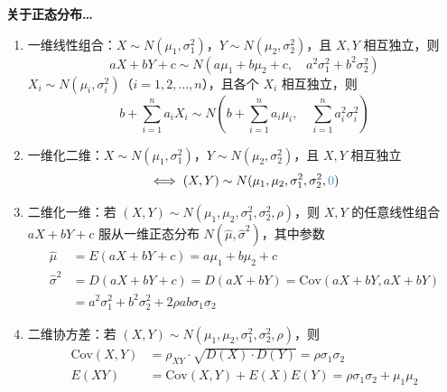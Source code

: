 \documentclass[UTF8]{ctexart}
\newcommand\Concept[1]{\textcolor{cyan!70!black}{#1}}
\newcommand\Cov{\mathrm{Cov}}
\begin{document}
\begin{mybox}
\textbf{关于正态分布…}
\begin{enumerate}
    \item 一维线性组合：$X\sim N(\mu_1,\sigma_1^2)$，$Y\sim N(\mu_2,\sigma_2^2)$，且 $X,Y$ \Concept{相互独立}，则
    \begin{equation*}
        aX+bY+c\sim N(a\mu_1+b\mu_2+c, \quad a^2\sigma_1^2+b^2\sigma_2^2)
    \end{equation*}
    $X_i\sim N(\mu_i, \sigma_i^2)$（$i=1,2,\dots,n$），且各个 $X_i$ \Concept{相互独立}，则
    \begin{equation*}
        b+\sum\limits_{i=1}^n  a_iX_i \sim N\left(b+\sum\limits_{i=1}^n  a_i\mu_i, \quad \sum\limits_{i=1}^n a_i^2\sigma_i^2\right)
    \end{equation*}
    \item 一维化二维：$X\sim N(\mu_1,\sigma_1^2)$，$Y\sim N(\mu_2,\sigma_2^2)$，且 $X,Y$ \Concept{相互独立}
    \begin{equation*}
        \iff (X,Y)\sim N(\mu_1,\mu_2,\sigma_1^2,\sigma_2^2,\textcolor{cyan!70!black}{0})
    \end{equation*}
    \item 二维化一维：若 $(X,Y)\sim N(\mu_1,\mu_2,\sigma_1^2,\sigma_2^2,\rho)$，则 $X,Y$ 的任意线性组合 $aX+bY+c$ 服从一维正态分布 $N(\hat{\mu},\hat{\sigma}^2)$，其中参数
    \begin{equation*}
    \begin{aligned}
        \hat{\mu} &= E(aX+bY+c) = a\mu_1+b\mu_2+c \\
        \hat{\sigma}^2 &= D(aX+bY+c) = D(aX+bY) = \Cov(aX+bY,aX+bY) \\
         &= a^2\sigma_1^2 + b^2\sigma_2^2 + 2\rho ab\sigma_1\sigma_2
    \end{aligned}
    \end{equation*}
    \item 二维协方差：若 $(X,Y)\sim N(\mu_1,\mu_2,\sigma_1^2,\sigma_2^2,\rho)$，则
    \begin{equation*}
    \begin{aligned}
        \Cov(X,Y) &= \rho_{XY}\cdot \sqrt{D(X)\cdot D(Y)} = \rho \sigma_1 \sigma_2 \\
        E(XY) &= \Cov(X,Y)+E(X)E(Y) = \rho\sigma_1\sigma_2 + \mu_1\mu_2 \\
    \end{aligned}
    \end{equation*}
\end{enumerate}

\end{mybox}
\end{document}

